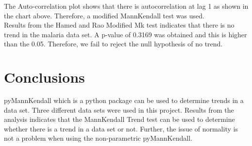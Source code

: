 \documentclass[12pt, letterpaper, twoside]{article}
\begin{document}
The Auto-correlation plot shows that there is autocorrelation at lag 1 as shown in the chart above. Therefore, a modified MannKendall test was used.\\   
Results from the Hamed and Rao Modified Mk test indicates that there is no trend in the malaria data set. A p-value of 0.3169 was obtained and this is higher than the 0.05. Therefore, we fail to reject the null hypothesis of no trend. 
\section{Conclusions}
pyMannKendall which is a python package can be used to determine trends in a data set. Three different data sets were used in this project. Results from the analysis indicates that the MannKendall Trend test can be used to determine whether there is a trend in a data set or not. Further, the issue of normality is not a problem when using the non-parametric pyMannKendall. 
\end{document}
